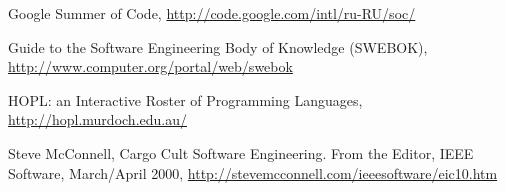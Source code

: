 \documentclass[a4paper]{article}
\begin{document}
\begin{thebibliography}{9001}
   Google Summer of Code, \url{http://code.google.com/intl/ru-RU/soc/}

   Guide to the Software Engineering Body of Knowledge (SWEBOK), \url{http://www.computer.org/portal/web/swebok}
  
   HOPL: an Interactive Roster of Programming Languages,  \url{http://hopl.murdoch.edu.au/}
  
   Steve McConnell, Cargo Cult Software Engineering. From the Editor, IEEE Software, March/April 2000, \url{http://stevemcconnell.com/ieeesoftware/eic10.htm}


\end{thebibliography}
\end{document}
